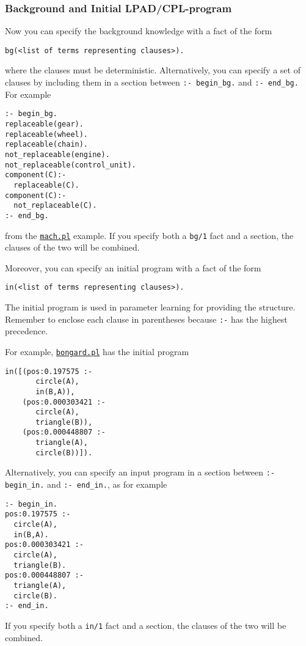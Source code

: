 \subsubsection{Background and Initial LPAD/CPL-program}
%
Now you can specify the background knowledge with a 
fact of the form 
\begin{verbatim}
bg(<list of terms representing clauses>).
\end{verbatim}
where the clauses must  be deterministic.
Alternatively, you can specify a set of clauses by including them in 
a section between
\verb|:- begin_bg.| and \verb|:- end_bg.| For example
\begin{verbatim}
:- begin_bg.
replaceable(gear).
replaceable(wheel).
replaceable(chain).
not_replaceable(engine).
not_replaceable(control_unit).
component(C):-
  replaceable(C).
component(C):-
  not_replaceable(C).
:- end_bg.
\end{verbatim}
from the \href{http://cplint.eu/example/learning/mach.pl}{\texttt{mach.pl}} example.
If you specify both a \verb|bg/1| fact and a section, the clauses of the two will be combined.


Moreover, you can specify an initial program with a fact of the form 
\begin{verbatim}
in(<list of terms representing clauses>).
\end{verbatim}
The initial program is used in parameter learning for providing 
the structure.
Remember to enclose each clause in parentheses because \verb|:-| has the highest precedence.

For example, \href{http://cplint.eu/example/learning/bongard.pl}{\texttt{bongard.pl}} has the initial program 
\begin{verbatim}
in([(pos:0.197575 :-
       circle(A),
       in(B,A)),
    (pos:0.000303421 :-
       circle(A),
       triangle(B)), 
    (pos:0.000448807 :-
       triangle(A),
       circle(B))]).
\end{verbatim}
Alternatively, you can specify an input program in a section between \verb|:- begin_in.| and \verb|:- end_in.|, as for example
\begin{verbatim}
:- begin_in.
pos:0.197575 :-
  circle(A),
  in(B,A).
pos:0.000303421 :-
  circle(A),
  triangle(B).
pos:0.000448807 :-
  triangle(A),
  circle(B).
:- end_in.
\end{verbatim}
If you specify both a \verb|in/1| fact and a section, the clauses of the two will be combined.

